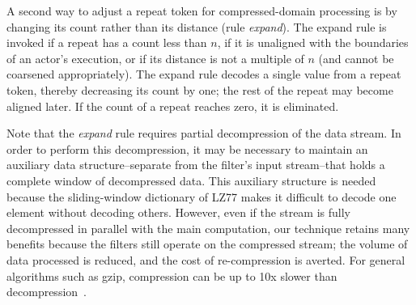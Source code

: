 A second way to adjust a repeat token for compressed-domain processing
is by changing its count rather than its distance (rule {\it expand}).
The expand rule is invoked if a repeat has a count less than $n$, if
it is unaligned with the boundaries of an actor's execution, or if its
distance is not a multiple of $n$ (and cannot be coarsened
appropriately).  The expand rule decodes a single value from a repeat
token, thereby decreasing its count by one; the rest of the repeat may
become aligned later.  If the count of a repeat reaches zero, it is
eliminated.

Note that the {\it expand} rule requires partial decompression of the
data stream.  In order to perform this decompression, it may be
necessary to maintain an auxiliary data structure--separate from the
filter's input stream--that holds a complete window of decompressed
data.  This auxiliary structure is needed because the sliding-window
dictionary of LZ77 makes it difficult to decode one element without
decoding others.  However, even if the stream is fully decompressed in
parallel with the main computation, our technique retains many
benefits because the filters still operate on the compressed stream;
the volume of data processed is reduced, and the cost of
re-compression is averted.  For general algorithms such as gzip,
compression can be up to 10x slower than
decompression~\cite{ziviani00compression}.


